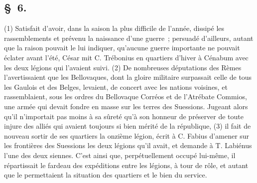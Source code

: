 \documentclass[french,twoside]{book} %
\begin{document}
\subsection[{§ 6.}]{ \textsc{§ 6.} }
\noindent (1) Satisfait d’avoir, dans la saison la plus difficile de l’année, dissipé les rassemblements et prévenu la naissance d’une guerre ; persuadé d’ailleurs, autant que la raison pouvait le lui indiquer, qu’aucune guerre importante ne pouvait éclater avant l’été, César mit C. Trébonius en quartiers d’hiver à Cénabum avec les deux légions qui l’avaient suivi. (2) De nombreuses députations des Rèmes l’avertissaient que les Bellovaques, dont la gloire militaire surpassait celle de tous les Gaulois et des Belges, levaient, de concert avec les nations voisines, et rassemblaient, sous les ordres du Bellovaque Corréos et de l’Atrébate Commios, une armée qui devait fondre en masse sur les terres des Suessions. Jugeant alors qu’il n’importait pas moins à sa sûreté qu’à son honneur de préserver de toute injure des alliés qui avaient toujours si bien mérité de la république, (3) il fait de nouveau sortir de ses quartiers la onzième légion, écrit à C. Fabius d’amener sur les frontières des Suessions les deux légions qu’il avait, et demande à T. Labiénus l’une des deux siennes. C'est ainsi que, perpétuellement occupé lui-même, il répartissait le fardeau des expéditions entre les légions, à tour de rôle, et autant que le permettaient la situation des quartiers et le bien du service.
\end{document}
